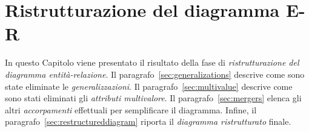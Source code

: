 \chapter{Ristrutturazione del diagramma E-R}
In questo Capitolo viene presentato il risultato della fase di {\it ristrutturazione del diagramma entità-relazione}. Il
paragrafo~\vref{sec:generalizations} descrive come sono state eliminate le {\it generalizzazioni}. Il
paragrafo~\vref{sec:multivalue} descrive come sono stati eliminati gli {\it attributi multivalore}. Il
paragrafo~\vref{sec:mergers} elenca gli altri {\it accorpamenti} effettuali per semplificare il diagramma. Infine,
il paragrafo~\vref{sec:restructureddiagram} riporta il {\it diagramma ristrutturato} finale.



%

